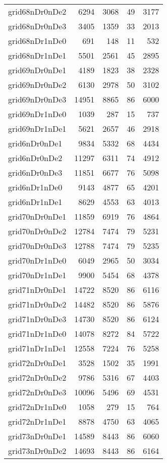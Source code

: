 \documentclass[../../../thesis.tex]{subfiles}
\begin{document}
\begin{longtable}{lrrrr}
grid68nDr0nDe2 & 6294 & 3068 & 49 & 3177 \\
grid68nDr0nDe3 & 3405 & 1359 & 33 & 2013 \\
grid68nDr1nDe0 & 691 & 148 & 11 & 532 \\
grid68nDr1nDe1 & 5501 & 2561 & 45 & 2895 \\
grid69nDr0nDe1 & 4189 & 1823 & 38 & 2328 \\
grid69nDr0nDe2 & 6130 & 2978 & 50 & 3102 \\
grid69nDr0nDe3 & 14951 & 8865 & 86 & 6000 \\
grid69nDr1nDe0 & 1039 & 287 & 15 & 737 \\
grid69nDr1nDe1 & 5621 & 2657 & 46 & 2918 \\
grid6nDr0nDe1 & 9834 & 5332 & 68 & 4434 \\
grid6nDr0nDe2 & 11297 & 6311 & 74 & 4912 \\
grid6nDr0nDe3 & 11851 & 6677 & 76 & 5098 \\
grid6nDr1nDe0 & 9143 & 4877 & 65 & 4201 \\
grid6nDr1nDe1 & 8629 & 4553 & 63 & 4013 \\
grid70nDr0nDe1 & 11859 & 6919 & 76 & 4864 \\
grid70nDr0nDe2 & 12784 & 7474 & 79 & 5231 \\
grid70nDr0nDe3 & 12788 & 7474 & 79 & 5235 \\
grid70nDr1nDe0 & 6049 & 2965 & 50 & 3034 \\
grid70nDr1nDe1 & 9900 & 5454 & 68 & 4378 \\
grid71nDr0nDe1 & 14722 & 8520 & 86 & 6116 \\
grid71nDr0nDe2 & 14482 & 8520 & 86 & 5876 \\
grid71nDr0nDe3 & 14730 & 8520 & 86 & 6124 \\
grid71nDr1nDe0 & 14078 & 8272 & 84 & 5722 \\
grid71nDr1nDe1 & 12558 & 7224 & 76 & 5258 \\
grid72nDr0nDe1 & 3528 & 1502 & 35 & 1991 \\
grid72nDr0nDe2 & 9786 & 5316 & 67 & 4403 \\
grid72nDr0nDe3 & 10096 & 5496 & 69 & 4531 \\
grid72nDr1nDe0 & 1058 & 279 & 15 & 764 \\
grid72nDr1nDe1 & 8878 & 4750 & 63 & 4065 \\
grid73nDr0nDe1 & 14589 & 8443 & 86 & 6060 \\
grid73nDr0nDe2 & 14693 & 8443 & 86 & 6164 \\

\end{longtable}
\end{document}
